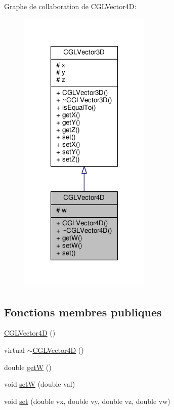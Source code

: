 Graphe de collaboration de C\-G\-L\-Vector4\-D\-:\nopagebreak
\begin{figure}[H]
\begin{center}
\leavevmode
\includegraphics[width=178pt]{da/d0f/class_c_g_l_vector4_d__coll__graph}
\end{center}
\end{figure}
\subsection*{Fonctions membres publiques}
\begin{DoxyCompactItemize}
\item 
\hyperlink{class_c_g_l_vector4_d_aa722cb71a0a7eb1bc325f560535e0401}{C\-G\-L\-Vector4\-D} ()
\item 
virtual \hyperlink{class_c_g_l_vector4_d_aca6634e555c9b7778344d304b1d540a9}{$\sim$\-C\-G\-L\-Vector4\-D} ()
\item 
double \hyperlink{class_c_g_l_vector4_d_a3b9e7ede466c3a97efe8b818a11dfd3b}{get\-W} ()
\item 
void \hyperlink{class_c_g_l_vector4_d_a754d8afb0203dc8048dac865840565ae}{set\-W} (double val)
\item 
void \hyperlink{class_c_g_l_vector4_d_a9f4c89b5e30ad2cfb18327e5e17257ab}{set} (double vx, double vy, double vz, double vw)
\end{DoxyCompactItemize}
